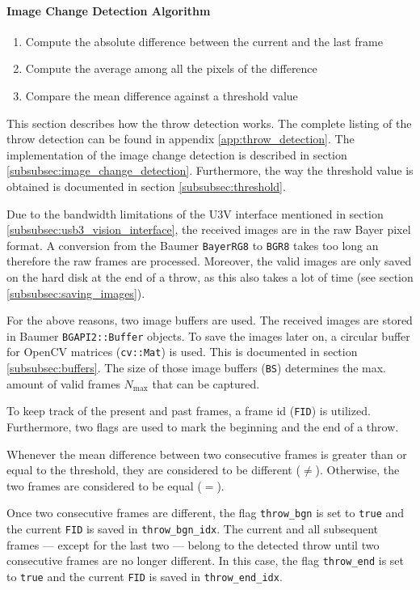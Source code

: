 \paragraph{Image Change Detection Algorithm}
\vspace{-20pt}
\begin{enumerate}
  \item Compute the absolute difference between the current and the last frame
  \item Compute the average among all the pixels of the difference
  \item Compare the mean difference against a threshold value
\end{enumerate}

This section describes how the throw detection works.
The complete listing of the throw detection can be found in appendix \ref{app:throw_detection}.
The implementation of the image change detection is described in section \ref{subsubsec:image_change_detection}.
Furthermore, the way the threshold value is obtained is documented in section \ref{subsubsec:threshold}.

Due to the bandwidth limitations of the U3V interface mentioned in section \ref{subsubsec:usb3_vision_interface}, the received images are in the raw Bayer pixel format.
A conversion from the Baumer \texttt{BayerRG8} to \texttt{BGR8} takes too long an therefore the raw frames are processed.
Moreover, the valid images are only saved on the hard disk at the end of a throw, as this also takes a lot of time (see section \ref{subsubsec:saving_images}).

For the above reasons, two image buffers are used.
The received images are stored in Baumer \texttt{BGAPI2::Buffer} objects.
To save the images later on, a circular buffer for OpenCV matrices (\texttt{cv::Mat}) is used.
This is documented in section \ref{subsubsec:buffers}.
The size of those image buffers (\texttt{BS}) determines the max. amount of valid frames $N_\text{max}$ that can be captured.

To keep track of the present and past frames, a frame id (\texttt{FID}) is utilized.
Furthermore, two flags are used to mark the beginning and the end of a throw.

Whenever the mean difference between two consecutive frames is greater than or equal to the threshold, they are considered to be different ($\ne$).
Otherwise, the two frames are considered to be equal ($=$).

Once two consecutive frames are different, the flag \texttt{throw\_bgn} is set to \texttt{true} and the current \texttt{FID} is saved in \texttt{throw\_bgn\_idx}.
The current and all subsequent frames --- except for the last two --- belong to the detected throw until two consecutive frames are no longer different.
In this case, the flag \texttt{throw\_end} is set to \texttt{true} and the current \texttt{FID} is saved in \texttt{throw\_end\_idx}.

